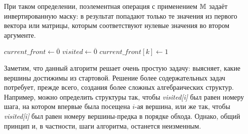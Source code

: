 При таком определении, поэлементная операция с применением $\mathbb{M}$ задаёт инвертированную маску: в результат попадают только те значения из первого вектора или матрицы, которым соответствуют нулевые значения во втором аргументе.

\begin{algorithm}
    $\mathit{current\_front} \leftarrow \overline{0}$\;
    $\mathit{visited} \leftarrow \overline{0}$\;
    $\mathit{current\_front}[k] \leftarrow 1$\;
    \;
    \caption{Алгоритм обхода в ширину в терминах линейной алгебры}
    \label{algo:BFS_linal}
\end{algorithm}

Заметим, что данный алгоритм решает очень простую задачу: выясняет, какие вершины достижимы из стартовой.
Решение более содержательных задач потребует, прежде всего, создания более сложных алгебраических структур.
Например, можно определить структуры так, чтобы \emph{visited[i]} был равен номеру шага, на котором впервые была посещена $i$-ая вершина,
или же так, чтобы \emph{visited[i]} был равен номеру вершины-предка в порядке обхода.
Однако, общий принцип и, в частности, шаги алгоритма, останется неизменным.

